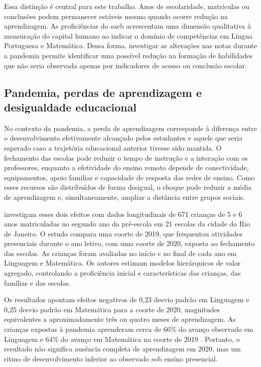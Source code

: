 \documentclass[
	12pt,				%
	openright,			%
	oneside,			%
	a4paper,			%
	brazil,				%
	]{article}
\begin{document}
Essa distinção é central para este trabalho. Anos de escolaridade, matrículas ou
conclusões podem permanecer estáveis mesmo quando ocorre redução na aprendizagem.
As proficiências do \acrshort{saeb} acrescentam uma dimensão qualitativa à
mensuração do capital humano ao indicar o domínio de competências em Língua
Portuguesa e Matemática. Dessa forma, investigar as alterações nas notas durante
a pandemia permite identificar uma possível redução na formação de habilidades
que não seria observada apenas por indicadores de acesso ou conclusão escolar.

\subsection{Pandemia, perdas de aprendizagem e desigualdade educacional}

No contexto da pandemia, a perda de aprendizagem corresponde à diferença entre
o desenvolvimento efetivamente alcançado pelos estudantes e aquele que seria
esperado caso a trajetória educacional anterior tivesse sido mantida. O
fechamento das escolas pode reduzir o tempo de instrução e a interação com os
professores, enquanto a efetividade do ensino remoto depende de conectividade,
equipamentos, apoio familiar e capacidade de resposta das redes de ensino. Como
esses recursos são distribuídos de forma desigual, o choque pode reduzir a média
de aprendizagem e, simultaneamente, ampliar a distância entre grupos sociais.

\textcite{bartholo_koslinski_tymms_castro_2023} investigam esses dois efeitos
com dados longitudinais de 671 crianças de 5 e 6 anos matriculadas no segundo ano
da pré-escola em 21 escolas da cidade do Rio de Janeiro. O estudo compara uma
coorte de 2019, que frequentou atividades presenciais durante o ano letivo, com
uma coorte de 2020, exposta ao fechamento das escolas. As crianças foram avaliadas
no início e no final de cada ano em Linguagem e Matemática. Os autores estimam
modelos hierárquicos de valor agregado, controlando a proficiência inicial e
características das crianças, das famílias e das escolas.

Os resultados apontam efeitos negativos de 0,23 desvio padrão em Linguagem e
0,25 desvio padrão em Matemática para a coorte de 2020, magnitudes equivalentes
a aproximadamente três ou quatro meses de aprendizagem. As crianças expostas à 
pandemia aprenderam cerca de 66\% do avanço observado em Linguagem e 64\% do avanço
em Matemática na coorte de 2019 \cite{bartholo_koslinski_tymms_castro_2023}. 
Portanto, o resultado não significa ausência completa de aprendizagem em 2020,
mas um ritmo de desenvolvimento inferior ao observado sob ensino presencial.
\end{document}
